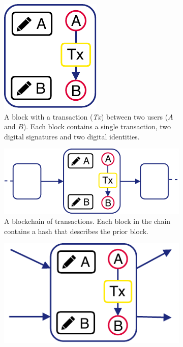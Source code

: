 \begin{figure}[t]
	\centering
	\begin{subfigure}[t]{.33\textwidth}
		\centering
		\captionsetup{width=.9\linewidth}
		\includegraphics[width=.35\linewidth]{xchange/assets/trustchain_tutorial_1}
		\caption{A block with a transaction (\emph{Tx}) between two users ($ A $ and $ B $). Each block contains a single transaction, two digital signatures and two digital identities.}
		\label{fig:trustchain_tutorial_1}
	\end{subfigure}%
	\begin{subfigure}[t]{.33\textwidth}
		\centering
		\captionsetup{width=.9\linewidth}
		\includegraphics[width=\linewidth]{xchange/assets/trustchain_tutorial_2}
		\caption{A blockchain of transactions. Each block in the chain contains a hash that describes the prior block.}
		\label{fig:trustchain_tutorial_2}
	\end{subfigure}%
	\begin{subfigure}[t]{.33\textwidth}
		\centering
		\captionsetup{width=.9\linewidth}
		\includegraphics[width=.7\linewidth]{xchange/assets/trustchain_tutorial_3}

\end{subfigure}
\end{figure}
